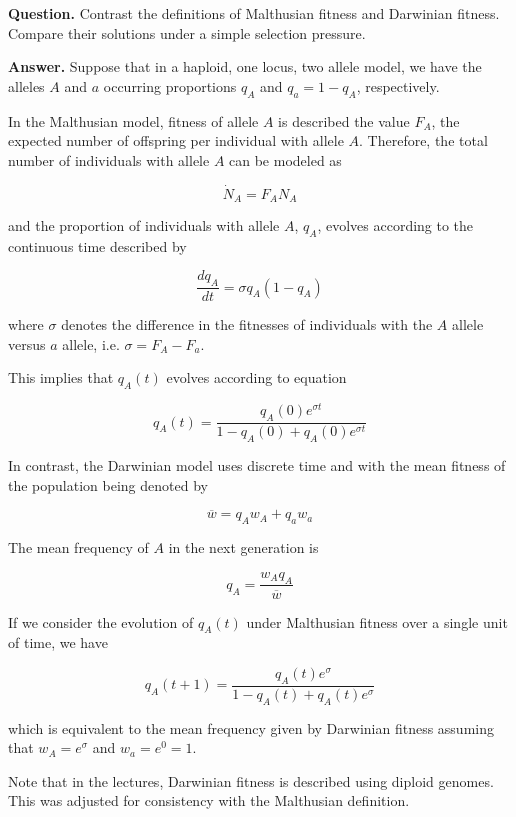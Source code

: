 \textbf{Question.} Contrast the definitions of Malthusian fitness and Darwinian fitness. Compare their solutions under a simple selection pressure.
	
	\textbf{Answer.} Suppose that in a haploid, one locus, two allele model, we have the alleles $A$ and $a$ occurring proportions $q_A$ and $q_a = 1-q_A$, respectively.

In the Malthusian model, fitness of allele $A$ is described the value $F_A$, the expected number of offspring per individual with allele $A$. Therefore, the total number of individuals with allele $A$ can be modeled as 

\[\dot{N}_A = F_AN_A\]

and the proportion of individuals with allele $A$, $q_A$, evolves according to the continuous time described by

\[\frac{dq_A}{dt} = \sigma q_A (1-q_A)\]

where $\sigma$ denotes the difference in the fitnesses of individuals with the $A$ allele versus $a$ allele, i.e. $\sigma = F_A - F_a$. 

This implies that $q_A(t)$ evolves according to equation

\[q_A(t) = \frac{q_A(0) e^{\sigma t}}{1-q_A(0)+q_A(0)e^{\sigma t}}\]

In contrast, the Darwinian model uses discrete time and with the mean fitness of the population being denoted by

\[\overline{w} = q_{A}w_{A} + q_{a}w_{a}\]

The mean frequency of $A$ in the next generation is

\[q_A = \frac{w_{A}q_{A}}{\overline{w}}\]

If we consider the evolution of $q_A(t)$ under Malthusian fitness over a single unit of time, we have

\[q_A(t+1) = \frac{q_A(t)e^{\sigma}}{1-q_A(t)+q_A(t)e^{\sigma}}\]

which is equivalent to the mean frequency given by Darwinian fitness assuming that $w_A = e^\sigma$ and $w_a = e^0 =1$.

Note that in the lectures, Darwinian fitness is described using diploid genomes. This was adjusted for consistency with the Malthusian definition.
